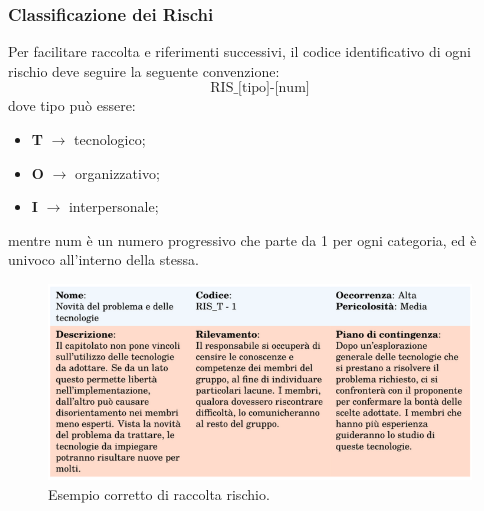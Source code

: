     \subsubsection{Classificazione dei Rischi}
    \label{classifrischi}
        Per facilitare raccolta e riferimenti successivi, il codice identificativo di ogni rischio deve seguire la seguente convenzione:
        $$ \text{RIS\_[tipo]-[num]} $$
        dove tipo può essere:
        \begin{itemize}
            \item \textbf{T} $\rightarrow$ tecnologico;
            \item \textbf{O} $\rightarrow$ organizzativo;
            \item \textbf{I} $\rightarrow$ interpersonale;
        \end{itemize}
    mentre num è un numero progressivo che parte da 1 per ogni categoria, ed è univoco all'interno della stessa.
    \begin{figure}[H]
        \centering
        \includegraphics[scale=0.6]{res/images/esempio_rischio.png}
        \caption{Esempio corretto di raccolta rischio.}
    \end{figure}

